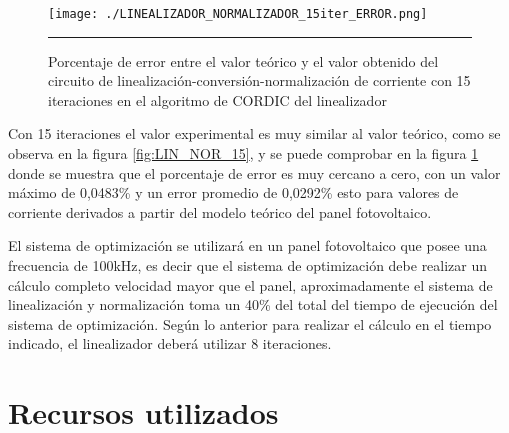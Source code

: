 \begin{figure}[H]
  \centering
    \texttt{[image: ./LINEALIZADOR\_NORMALIZADOR\_15iter\_ERROR.png]}
    \rule{35em}{0.5pt}
  \caption[Porcentaje de error entre el valor teórico y el valor obtenido del circuito de linealización-conversión-normalización de corriente con 15 iteraciones en el algoritmo de CORDIC del linealizador]{Porcentaje de error entre el valor teórico y el valor obtenido del circuito de linealización-conversión-normalización de corriente con 15 iteraciones en el algoritmo de CORDIC del linealizador}
  \label{fig:LIN_NOR_15_E}
\end{figure}

Con 15 iteraciones el valor experimental es muy similar al valor teórico, como se observa en la figura \ref{fig:LIN_NOR_15}, y se puede comprobar en la figura \ref{fig:LIN_NOR_15_E} donde se muestra que el porcentaje de error es muy cercano a cero, con un valor máximo de 0,0483\% y un error promedio de 0,0292\% esto para valores de corriente derivados a partir del modelo teórico del panel fotovoltaico.

El sistema de optimización se utilizará en un panel fotovoltaico que posee una frecuencia de 100kHz, es decir que el sistema de optimización debe realizar un cálculo completo velocidad mayor que el panel, aproximadamente el sistema de linealización y normalización toma un 40\% del total del tiempo de ejecución del sistema de optimización. Según lo anterior para realizar el cálculo en el tiempo indicado, el linealizador deberá utilizar 8 iteraciones.    


\section{Recursos utilizados}


